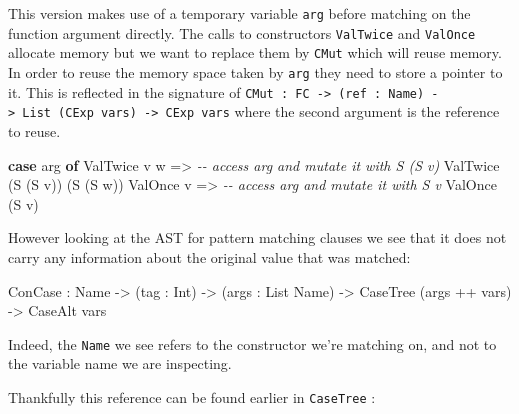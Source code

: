 \documentclass[
]{article}
\newenvironment{Shaded}{}{}
\newcommand{\CommentTok}[1]{\textcolor[rgb]{0.38,0.63,0.69}{\textit{#1}}}
\newcommand{\DataTypeTok}[1]{\textcolor[rgb]{0.56,0.13,0.00}{#1}}
\newcommand{\KeywordTok}[1]{\textcolor[rgb]{0.00,0.44,0.13}{\textbf{#1}}}
\newcommand{\NormalTok}[1]{#1}
\newcommand{\OperatorTok}[1]{\textcolor[rgb]{0.40,0.40,0.40}{#1}}
\newcommand{\OtherTok}[1]{\textcolor[rgb]{0.00,0.44,0.13}{#1}}
\begin{document}
This version makes use of a temporary variable \texttt{arg} before
matching on the function argument directly. The calls to constructors
\texttt{ValTwice} and \texttt{ValOnce} allocate memory but we want to
replace them by \texttt{CMut} which will reuse memory. In order to reuse
the memory space taken by \texttt{arg} they need to store a pointer to
it. This is reflected in the signature of
\texttt{CMut\ :\ FC\ -\textgreater{}\ (ref\ :\ Name)\ -\textgreater{}\ List\ (CExp\ vars)\ -\textgreater{}\ CExp\ vars}
where the second argument is the reference to reuse.

\begin{Shaded}
\begin{Highlighting}[]
\KeywordTok{case}\NormalTok{ arg }\KeywordTok{of}
     \DataTypeTok{ValTwice}\NormalTok{ v w }\OtherTok{=\textgreater{}} \CommentTok{{-}{-} access \textasciigrave{}arg\textasciigrave{} and mutate it with S (S v)}
                     \DataTypeTok{ValTwice}\NormalTok{ (}\DataTypeTok{S}\NormalTok{ (}\DataTypeTok{S}\NormalTok{ v)) (}\DataTypeTok{S}\NormalTok{ (}\DataTypeTok{S}\NormalTok{ w))}
     \DataTypeTok{ValOnce}\NormalTok{ v }\OtherTok{=\textgreater{}} \CommentTok{{-}{-} access \textasciigrave{}arg\textasciigrave{} and mutate it with S v}
                  \DataTypeTok{ValOnce}\NormalTok{ (}\DataTypeTok{S}\NormalTok{ v)}
\end{Highlighting}
\end{Shaded}

However looking at the AST for pattern matching clauses we see that it
does not carry any information about the original value that was
matched:

\begin{Shaded}
\begin{Highlighting}[]
\DataTypeTok{ConCase} \OperatorTok{:} \DataTypeTok{Name} \OtherTok{{-}\textgreater{}}\NormalTok{ (tag }\OperatorTok{:} \DataTypeTok{Int}\NormalTok{) }\OtherTok{{-}\textgreater{}}\NormalTok{ (args }\OperatorTok{:} \DataTypeTok{List} \DataTypeTok{Name}\NormalTok{) }\OtherTok{{-}\textgreater{}}
                 \DataTypeTok{CaseTree}\NormalTok{ (args }\OperatorTok{++}\NormalTok{ vars) }\OtherTok{{-}\textgreater{}} \DataTypeTok{CaseAlt}\NormalTok{ vars}
\end{Highlighting}
\end{Shaded}

Indeed, the \texttt{Name} we see refers to the constructor we're
matching on, and not to the variable name we are inspecting.

Thankfully this reference can be found earlier in \texttt{CaseTree} :
\end{document}
